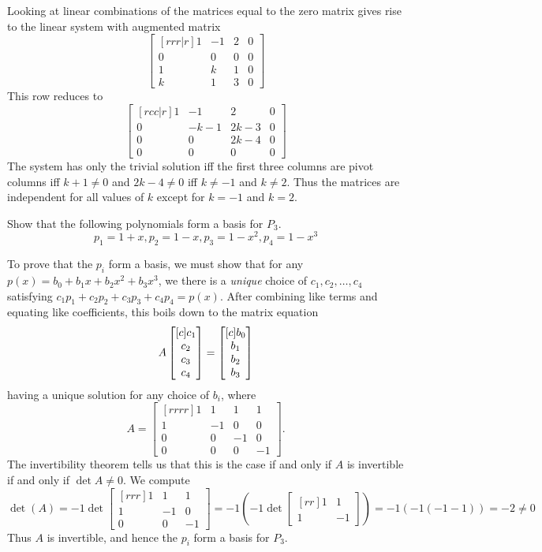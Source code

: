 \begin{solution}
\noindent 
Looking at linear combinations of the matrices equal to the zero matrix gives rise to the linear system with augmented matrix
\[
\begin{bmatrix}[rrr|r]
1&-1&2&0\\
0&0&0&0\\
1&k&1&0\\
k&1&3&0
\end{bmatrix}
\]
This row reduces to 
\[
\begin{bmatrix}[rcc|r]
1&-1&2&0\\
0&-k-1&2k-3&0\\
0&0&2k-4&0\\
0&0&0&0
\end{bmatrix}
\]
The system has only the trivial solution iff the first three columns are pivot columns iff $k+1\ne 0$ and $2k-4\ne 0$ iff $k\ne -1$ and $k\ne 2$. Thus the matrices are independent for all values of $k$ except for $k=-1$ and $k=2$.
\end{solution}
\ii \label{ex:basis} Show that the following polynomials form a basis for $P_3$.
\[
p_1=1+x, p_2=1-x, p_3=1-x^2, p_4=1-x^3
\]
\begin{solution}
To prove that the $p_i$ form a basis, we must show that for any $p(x)=b_0+b_1x+b_2x^2+b_3x^3$, we there is a {\em unique} choice of $c_1,c_2,\dots, c_4$ satisfying $c_1p_1+c_2p_2+c_3p_3+c_4p_4=p(x)$. After combining like terms and equating like coefficients, this boils down to the matrix equation 
\[
A\begin{bmatrix}[c] c_1\\c_2\\c_3\\c_4 \end{bmatrix}=\begin{bmatrix}[c] b_0\\ b_1\\ b_2\\ b_3 \end{bmatrix}
\]
having a unique solution for any choice of $b_i$, where 
\[
A = 
\begin{bmatrix}[rrrr]
1&1&1&1\\
1&-1&0&0\\
0&0&-1&0\\
0&0&0&-1
\end{bmatrix}.
\]
The invertibility theorem tells us that this is the case if and only if $A$ is invertible if and only if $\det A\ne 0$. We compute 
\[
\det(A) = -1\det
\begin{bmatrix}[rrr]
1&1&1\\
1&-1&0\\
0&0&-1
\end{bmatrix}
= -1\left(-1\det
\begin{bmatrix}[rr]
1&1\\
1&-1
\end{bmatrix}\right)
=-1(-1(-1-1)) = -2 \neq 0
\]
Thus $A$ is invertible, and hence the $p_i$ form a basis for $P_3$. 
\end{solution}

